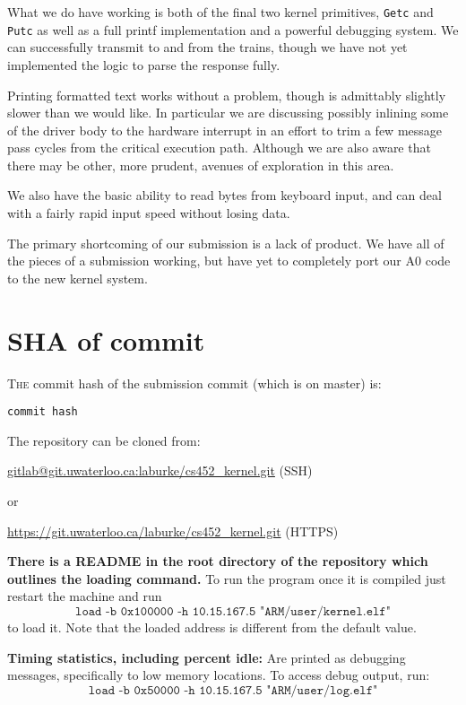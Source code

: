 \documentclass{amsart}
\begin{document}
What we do have working is both of the final two kernel primitives,
\texttt{Getc} and \texttt{Putc} as well as a full printf implementation and a
powerful debugging system. We can successfully transmit to and from the trains,
though we have not yet implemented the logic to parse the response fully.

Printing formatted text works without a problem, though is admittably slightly
slower than we would like. In particular we are discussing possibly inlining
some of the driver body to the hardware interrupt in an effort to trim a few
message pass cycles from the critical execution path. Although we are also aware
that there may be other, more prudent, avenues of exploration in this area.

We also have the basic ability to read bytes from keyboard input, and can deal
with a fairly rapid input speed without losing data.

The primary shortcoming of our submission is a lack of product. We have all of
the pieces of a submission working, but have yet to completely port our A0 code
to the new kernel system.

\section*{SHA of commit}

\textsc{The} commit hash of the submission commit (which is on master) is:

\texttt{{{{commit hash}}}}

\noindent The repository can be cloned from:

\url{gitlab@git.uwaterloo.ca:laburke/cs452_kernel.git} (SSH)

or

\url{https://git.uwaterloo.ca/laburke/cs452_kernel.git} (HTTPS)

\textbf{There is a README in the root directory of the repository which outlines
the loading command.} To run the program once it is compiled just restart the
machine and run
\[\texttt{load -b 0x100000 -h 10.15.167.5
"ARM/user/kernel.elf"}\]
to load it. Note that the loaded address is different
from the default value.

\textbf{Timing statistics, including percent idle:} Are printed as debugging messages, specifically to low memory locations. To access debug output, run:
\[\texttt{load -b 0x50000 -h 10.15.167.5
"ARM/user/log.elf"}\]
\end{document}
